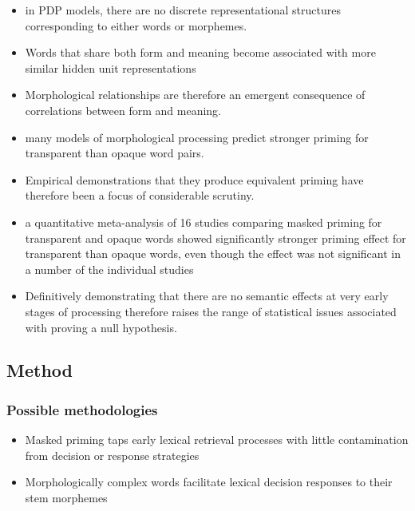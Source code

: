 \documentclass[]{article}
\begin{document}
{\begin{itemize}
			\item in PDP models,  there are no discrete representational structures corresponding to either words or morphemes.
			\item Words that share both form and meaning become associated with more similar hidden unit representations
			\item Morphological relationships are therefore an emergent consequence of correlations between form and meaning.
			\item many models of morphological processing predict stronger priming for transparent than opaque word pairs.
			\item Empirical demonstrations that they produce equivalent priming have therefore been a focus of considerable scrutiny. 
			\item  a quantitative meta-analysis of 16 studies comparing masked priming for transparent and opaque words showed significantly stronger priming effect for transparent than opaque words, even though the effect was not significant in a number of the individual studies
			\item Definitively demonstrating that there are no semantic effects at very early stages of processing therefore raises the range of statistical issues associated with proving a null hypothesis.
		\end{itemize}
		\subsection{Method}	
			\subsubsection{Possible methodologies}
			\begin{itemize}
				\item Masked priming taps early lexical retrieval processes with little contamination from decision or response strategies
				\item Morphologically complex words facilitate lexical decision responses to their stem morphemes
			\end{itemize}
		
}
\end{document}

